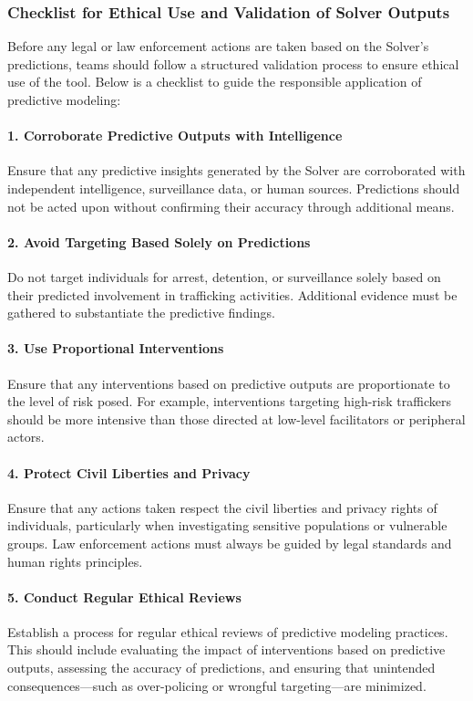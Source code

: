 \documentclass[%
 preprint, linenumbers,
 amsmath,amssymb,
 aps, physrev,
]{revtex4-2}
\begin{document}
\subsubsection{Checklist for Ethical Use and Validation of Solver Outputs}

Before any legal or law enforcement actions are taken based on the Solver’s predictions, teams should follow a structured validation process to ensure ethical use of the tool. Below is a checklist to guide the responsible application of predictive modeling:

\paragraph{1. Corroborate Predictive Outputs with Intelligence}
Ensure that any predictive insights generated by the Solver are corroborated with independent intelligence, surveillance data, or human sources. Predictions should not be acted upon without confirming their accuracy through additional means.

\paragraph{2. Avoid Targeting Based Solely on Predictions}
Do not target individuals for arrest, detention, or surveillance solely based on their predicted involvement in trafficking activities. Additional evidence must be gathered to substantiate the predictive findings.

\paragraph{3. Use Proportional Interventions}
Ensure that any interventions based on predictive outputs are proportionate to the level of risk posed. For example, interventions targeting high-risk traffickers should be more intensive than those directed at low-level facilitators or peripheral actors.

\paragraph{4. Protect Civil Liberties and Privacy}
Ensure that any actions taken respect the civil liberties and privacy rights of individuals, particularly when investigating sensitive populations or vulnerable groups. Law enforcement actions must always be guided by legal standards and human rights principles.

\paragraph{5. Conduct Regular Ethical Reviews}
Establish a process for regular ethical reviews of predictive modeling practices. This should include evaluating the impact of interventions based on predictive outputs, assessing the accuracy of predictions, and ensuring that unintended consequences—such as over-policing or wrongful targeting—are minimized.
\end{document}
